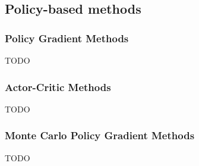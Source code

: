 \documentclass[../chapters.tex]{subfiles}
\begin{document}
    \subsection{Policy-based methods}\label{subsec:policy-based-methods}

    \subsubsection{Policy Gradient Methods}\label{subsubsec:policy-gradient-methods}
    TODO

    \subsubsection{Actor-Critic Methods}\label{subsubsec:actor-critic-methods}
    TODO

    \subsubsection{Monte Carlo Policy Gradient Methods}\label{subsubsec:monte-carlo-policy-gradient-methods}
    TODO
\end{document}
